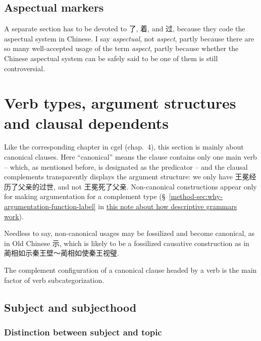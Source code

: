 \documentclass[UTF8, a4paper, oneside, scheme=plain]{ctexart}
\newcommand*{\citesec}[1]{\S~{#1}}
\newcommand*{\citechap}[1]{chap.~{#1}}
\newcommand*{\term}[1]{\emph{#1}}
\newcommand{\method}{\href{../methodology/glossing.pdf}{this note about how descriptive grammars work}}
\begin{document}
\subsection{Aspectual markers}\label{sec:aspectual}

A separate section has to be devoted to 了, 着, and 过,
because they code the aspectual system in Chinese.
I say \term{aspectual}, not \term{aspect},
partly because there are so many well-accepted usage of the term \term{aspect},
partly because whether the Chinese aspectual system can be safely said to be one of them is still controversial.

\section{Verb types, argument structures and clausal dependents}\label{sec:verb-type-canonical}


Like the corresponding chapter in \ac{cgel} (\citechap{4}),
this section is mainly about canonical clauses.
Here ``canonical'' means
the clause contains only one main verb 
-- which, as mentioned before, is designated as the predicator -- 
and the clausal complements transparently displays the argument structure:
we only have 王冕经历了父亲的过世, and not 王冕死了父亲.
Non-canonical constructions appear only for making argumentation for a complement type
(\citesec{\ref{method-sec:why-argumentation-function-label}} in \method).

Needless to say, non-canonical usages may be fossilized
and become canonical, 
as in Old Chinese 示,
which is likely to be a fossilized causative construction as in
蔺相如示秦王壁～蔺相如使秦王视璧.

The complement configuration of a canonical clause headed by a verb 
is the main factor of verb subcategorization.

\subsection{Subject and subjecthood}\label{sec:subject}


\subsubsection{Distinction between subject and topic}
\end{document}
